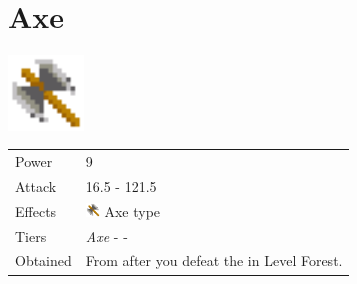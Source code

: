 \section{Axe}
\label{weapon:axe}

\includegraphics[height=2cm,keepaspectratio]{./resources/weapons/axe}

\begin{longtable}{ l p{9cm} }
	Power
	& 9
\\ %
	Attack
	& 16.5 - 121.5
\\ %
	Effects
	& \includegraphics[height=1em,keepaspectratio]{./resources/effects/axe}
	Axe type
\\ %
	Tiers
	& \textit{Axe} - \nameref{weapon:battle_axe} - \nameref{weapon:giants_axe}
\\ %
	Obtained
	& From \nameref{char:kaeli} after you defeat the \nameref{monster:minotaur} in Level Forest.
\end{longtable}
